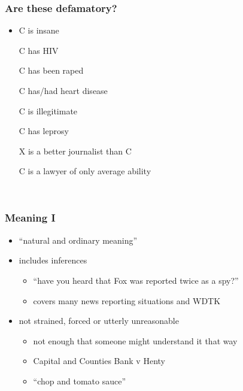 \documentclass[ignorenonframetext,]{beamer}
\begin{document}
\begin{frame}
\frametitle{Are these defamatory?}

\begin{itemize}
\item  C is insane

  C has HIV

  C has been raped

  C has/had heart disease

  C is illegitimate

  C has leprosy

  X is a better journalist than C

  C is a lawyer of only average ability
\end{itemize}

~


\end{frame}

\begin{frame}
\frametitle{Meaning I}

\begin{itemize}
\item  ``natural and ordinary meaning''
\item  includes inferences

  \begin{itemize}
  \item    ``have you heard that Fox was reported twice as a spy?''
  \item    covers many news reporting situations and WDTK
  \end{itemize}
\item  not strained, forced or utterly unreasonable

  \begin{itemize}
  \item    not enough that someone {might}{ understand it that way}
  \item    {Capital and Counties Bank v Henty}
  \item    {``}{chop and tomato sauce''}
  \end{itemize}
\end{itemize}

~


\end{frame}
\end{document}
